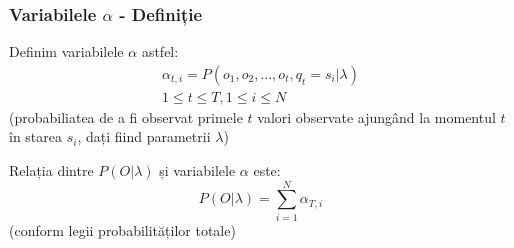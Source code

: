 \begin{frame}
  \frametitle{Variabilele $\alpha$ - Definiție}
  \begin{block}{}
    Definim variabilele $\alpha$ astfel:
    \begin{equation}
      \label{eq:alpha}
      \begin{split}
        \alpha_{t,i}=P(o_1,o_2,\ldots,o_t, q_t = s_i \vert \lambda) \\
        \scriptstyle{1 \le t \le T, 1 \le i \le N}
      \end{split}
    \end{equation}
    (probabiliatea de a fi observat primele $t$ valori observate
    ajungând la momentul $t$ în starea $s_i$, dați fiind parametrii
    $\lambda$)
  \end{block}%
  \pause%
  \begin{block}{}
    Relația dintre $P(O \vert \lambda)$ și variabilele $\alpha$ este:
    \begin{equation}
      \label{eq:eq1toalpha}
      P(O \vert \lambda) = \displaystyle\sum_{i=1}^{N}\alpha_{T,i}
    \end{equation}
    (conform legii probabilităților totale)
  \end{block}%
\end{frame}

